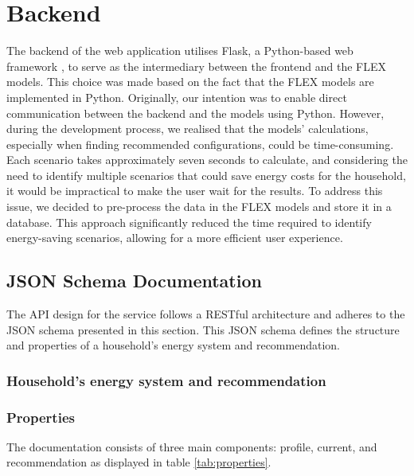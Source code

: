 \section{Backend}

The backend of the web application utilises Flask, a Python-based web framework \cite{flask}, to serve as the intermediary between the frontend and the FLEX models. 
This choice was made based on the fact that the FLEX models are implemented in Python. 
Originally, our intention was to enable direct communication between the backend and the models using Python. 
However, during the development process, we realised that the models' calculations, especially when finding recommended configurations, could be time-consuming. 
Each scenario takes approximately seven seconds to calculate, and considering the need to identify multiple scenarios that could save energy costs for the household, 
it would be impractical to make the user wait for the results. 
To address this issue, we decided to pre-process the data in the FLEX models and store it in a database. 
This approach significantly reduced the time required to identify energy-saving scenarios, allowing for a more efficient user experience.


\subsection{JSON Schema Documentation}

The API design for the service follows a RESTful architecture and adheres to the JSON schema presented in this section. 
This JSON schema defines the structure and properties of a household's energy system and recommendation.


\subsubsection{Household's energy system and recommendation}


\subsubsection{Properties}

The documentation consists of three main components: profile, current, and recommendation as displayed in table \ref{tab:properties}. 

